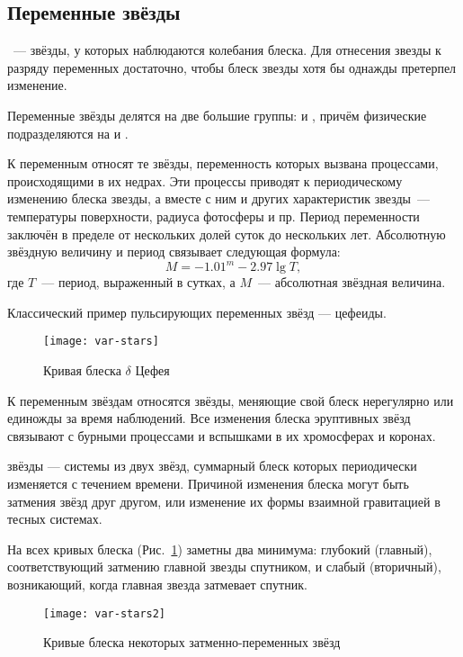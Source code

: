 \subsection{Переменные звёзды}
~--- звёзды, у которых наблюдаются колебания блеска.   Для отнесения звезды к разряду переменных достаточно, чтобы блеск звезды хотя бы однажды претерпел изменение.

Переменные звёзды делятся на две большие группы:  и , причём физические подразделяются на  и .

К  переменным  относят те звёзды, переменность которых вызвана процессами, происходящими в их недрах. Эти процессы приводят к периодическому изменению блеска звезды, а вместе с ним и других характеристик звезды~--- температуры поверхности, радиуса фотосферы и пр. Период переменности заключён в пределе от нескольких долей суток до нескольких лет. Абсолютную звёздную величину  и период связывает следующая формула:
\begin{equation}
	M = -1.01^m - 2.97\lg T,
\end{equation}
где $T$~--- период, выраженный в сутках, а $M$~--- абсолютная звёздная величина.

Классический пример пульсирующих переменных звёзд --- цефеиды.

\begin{figure}[h!]
\begin{center}
\texttt{[image: var-stars]}
\caption{Кривая блеска $\delta$ Цефея}
\end{center}
\end{figure}

К  переменным звёздам относятся звёзды, меняющие свой блеск нерегулярно или единожды за время наблюдений. Все изменения блеска эруптивных звёзд связывают с бурными процессами и вспышками в их хромосферах и коронах.

 звёзды --- системы из двух звёзд, суммарный блеск которых периодически изменяется с течением времени. Причиной изменения блеска могут быть затмения звёзд друг другом, или изменение их формы взаимной гравитацией в тесных системах.

На всех кривых блеска (Рис.~\ref{var-stars}) заметны два минимума: глубокий (главный), соответствующий затмению главной звезды спутником, и слабый (вторичный), возникающий, когда главная звезда затмевает спутник.

\begin{figure}[h!]
	\centering
	\texttt{[image: var-stars2]}
	\caption{Кривые блеска некоторых затменно-переменных звёзд}
	\label{var-stars}
\end{figure}



